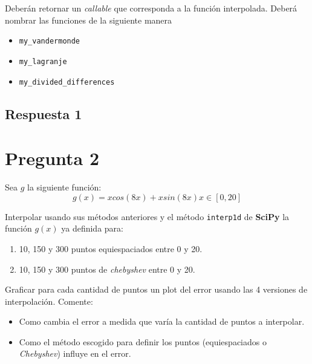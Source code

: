 \documentclass[spanish, fleqn]{article}
\begin{document}
Deberán retornar un \textit{callable} que corresponda a la función interpolada. Deberá nombrar las funciones de la siguiente manera

\begin{itemize}
    \item \texttt{my\_vandermonde}
    \item \texttt{my\_lagranje}
    \item \texttt{my\_divided\_differences}
\end{itemize}


\subsection{Respuesta 1}








\section{Pregunta 2}

Sea $g$ la siguiente función:
\begin{equation*}
    g(x) = x cos(8x) + x sin(8x) x \in [0, 20] 
\end{equation*}

Interpolar usando sus métodos anteriores y el método
\texttt{interp1d} de \textbf{SciPy} la función $g(x)$ ya definida para:
\begin{enumerate}
    \item 10, 150 y 300 puntos equiespaciados entre 0 y 20.
    \item 10, 150 y 300 puntos de \textit{chebyshev} entre 0 y 20.
\end{enumerate}

Graficar para cada cantidad de puntos un plot
del error usando las 4 versiones de interpolación. Comente:
\begin{itemize}
    \item Como cambia el error a medida que varía la cantidad de puntos a interpolar.
    \item Como el método escogido para definir los puntos (equiespaciados o \textit{Chebyshev}) influye en el error.
\end{itemize}
\end{document}
